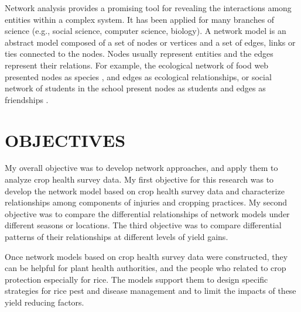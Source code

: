 Network analysis provides a promising tool for revealing the interactions among entities within a complex system. It has been applied for many branches of science (e.g., social science, computer science, biology). A network model is an abstract model composed of a set of nodes or vertices and a set of edges, links or ties connected to the nodes. Nodes usually represent entities and the edges represent their relations. For example, the ecological network of food web presented nodes as species , and edges as ecological relationships, or social network of  students in the school present nodes as students and edges as friendships . 

\section*{OBJECTIVES}


My overall objective was to develop network approaches, and apply them to analyze crop health survey data. My first objective for this research was to  develop the network model based on crop health survey data and characterize relationships among components of injuries and cropping practices. My second objective was to compare the differential relationships of network models under different seasons or locations. The third objective was to compare differential patterns of their relationships at different levels of yield gains.


Once network models based on crop health survey data were constructed, they can be helpful for plant health authorities, and the people who related to crop protection especially for rice. The models support them to design specific strategies for rice pest and disease management and to limit the impacts of these yield reducing factors.  


